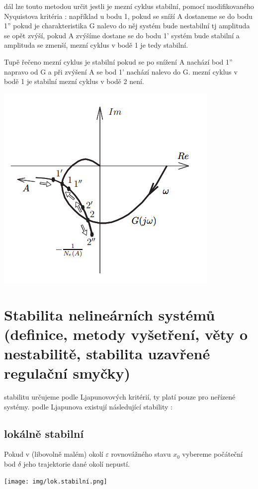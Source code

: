 dál lze touto metodou určit jestli je mezní cyklus stabilní, pomocí modifikovaného Nyquistova kritéria :
 například u bodu 1, pokud se sníží A dostaneme se do bodu 1'' pokud je charakteristika G nalevo do něj systém bude nestabilní tj amplituda se opět zvýší, pokud A zvýšíme dostane se do bodu 1' systém bude stabilní a amplituda se zmenší, mezní cyklus v bodě 1 je tedy stabilní.

 Tupě řečeno mezní cyklus je stabilní pokud se po snížení A nachází bod 1'' napravo od G a při zvýšení A se bod 1' nachází nalevo do G.
 mezní cyklus v bodě 1 je stabilní mezní cyklus v bodě 2 není.
 
 \includegraphics{img/stab.mez.cyklu.png}

 \section{Stabilita nelineárních systémů (definice, metody vyšetření, věty o nestabilitě, stabilita uzavřené regulační
 smyčky)}

 stabilitu určujeme podle Ljapunovových kritérií, ty platí pouze pro neřízené systémy.
 podle Ljapunova existují následující stability :

 \subsection{lokálně stabilní}
 Pokud v (libovolně malém) okolí $\varepsilon $ rovnovážného stavu $x_0$ vybereme počáteční bod $\delta $ jeho trajektorie dané okolí nepustí.

 \texttt{[image: img/lok.stabilní.png]}

